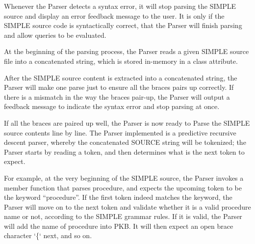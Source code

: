 \documentclass[12pt]{article}
\begin{document}
Whenever the Parser detects a syntax error, it will stop parsing the SIMPLE source and display an error feedback message to the user. It is only if the SIMPLE source code is syntactically correct, that the Parser will finish parsing and allow queries to be evaluated.

At the beginning of the parsing process, the Parser reads a given SIMPLE source file into a concatenated string, which is stored in-memory in a class attribute.

After the SIMPLE source content is extracted into a concatenated string, the Parser will make one parse just to ensure all the braces pairs up correctly. If there is a mismatch in the way the braces pair-up, the Parser will output a feedback message to indicate the syntax error and stop parsing at once.

If all the braces are paired up well, the Parser is now ready to Parse the SIMPLE source contents line by line. The Parser implemented is a predictive recursive descent parser, whereby the concatenated SOURCE string will be tokenized; the Parser starts by reading a token, and then determines what is the next token to expect.
\begin{center}
\end{center}
\vspace{10mm}For example, at the very beginning of the SIMPLE source, the Parser invokes a member function that parses procedure, and expects the upcoming token to be the keyword “procedure”. If the first token indeed matches the keyword, the Parser will move on to the next token and validate whether it is a valid procedure name or not, according to the SIMPLE grammar rules. If it is valid, the Parser will add the name of procedure into PKB. It will then expect an open brace character ‘\{‘ next, and so on.
\end{document}
